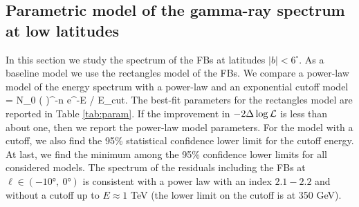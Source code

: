 \subsection{Parametric model of the gamma-ray spectrum at low latitudes}
\label{sec:param_model}

In this section we study the spectrum of the FBs at latitudes $|b| < 6^\circ$.
As a baseline model we use the rectangles model of the FBs.
We compare a power-law model of the energy spectrum with a power-law and an exponential cutoff model
\be
{} = N_0 \left(  \right)^{-n} e^{-E / E_{\rm cut}}.
\ee
The best-fit parameters for the rectangles model are reported in Table \ref{tab:param}.
If the improvement in $-2 \Delta \log {\mathcal{L}}$ is less than about one, then we report the power-law model parameters.
For the model with a cutoff, we also find the 95\% statistical confidence lower limit for the cutoff energy.
At last, we find the minimum among the 95\% confidence lower limits for all considered models.
The spectrum of the residuals including the FBs at  $\ell \in (\ang{-10},\ \ang{0})$
is consistent with a power law with an index $2.1 - 2.2$ and without a cutoff up to $E \approx 1$ TeV
(the lower limit on the cutoff is at 350 GeV).


